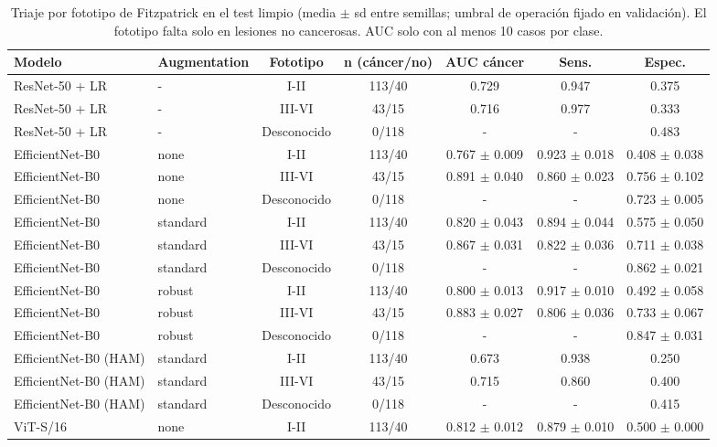 \begin{table}[t]
\caption{Triaje por fototipo de Fitzpatrick en el test limpio (media $\pm$ sd entre semillas; umbral de operación fijado en validación). El fototipo falta solo en lesiones no cancerosas. AUC solo con al menos 10 casos por clase.}
\label{tab:bias}
\centering
\begin{adjustbox}{max width=\linewidth}
\begin{tabular}{llccccc}
\toprule
Modelo & Augmentation & Fototipo & n (cáncer/no) & AUC cáncer & Sens. & Espec. \\
\midrule
ResNet-50 + LR & - & I-II & 113/40 & 0.729 & 0.947 & 0.375 \\
ResNet-50 + LR & - & III-VI & 43/15 & 0.716 & 0.977 & 0.333 \\
ResNet-50 + LR & - & Desconocido & 0/118 & - & - & 0.483 \\
EfficientNet-B0 & none & I-II & 113/40 & 0.767 $\pm$ 0.009 & 0.923 $\pm$ 0.018 & 0.408 $\pm$ 0.038 \\
EfficientNet-B0 & none & III-VI & 43/15 & 0.891 $\pm$ 0.040 & 0.860 $\pm$ 0.023 & 0.756 $\pm$ 0.102 \\
EfficientNet-B0 & none & Desconocido & 0/118 & - & - & 0.723 $\pm$ 0.005 \\
EfficientNet-B0 & standard & I-II & 113/40 & 0.820 $\pm$ 0.043 & 0.894 $\pm$ 0.044 & 0.575 $\pm$ 0.050 \\
EfficientNet-B0 & standard & III-VI & 43/15 & 0.867 $\pm$ 0.031 & 0.822 $\pm$ 0.036 & 0.711 $\pm$ 0.038 \\
EfficientNet-B0 & standard & Desconocido & 0/118 & - & - & 0.862 $\pm$ 0.021 \\
EfficientNet-B0 & robust & I-II & 113/40 & 0.800 $\pm$ 0.013 & 0.917 $\pm$ 0.010 & 0.492 $\pm$ 0.058 \\
EfficientNet-B0 & robust & III-VI & 43/15 & 0.883 $\pm$ 0.027 & 0.806 $\pm$ 0.036 & 0.733 $\pm$ 0.067 \\
EfficientNet-B0 & robust & Desconocido & 0/118 & - & - & 0.847 $\pm$ 0.031 \\
EfficientNet-B0 (HAM) & standard & I-II & 113/40 & 0.673 & 0.938 & 0.250 \\
EfficientNet-B0 (HAM) & standard & III-VI & 43/15 & 0.715 & 0.860 & 0.400 \\
EfficientNet-B0 (HAM) & standard & Desconocido & 0/118 & - & - & 0.415 \\
ViT-S/16 & none & I-II & 113/40 & 0.812 $\pm$ 0.012 & 0.879 $\pm$ 0.010 & 0.500 $\pm$ 0.000 \\

\end{tabular}
\end{adjustbox}
\end{table}
